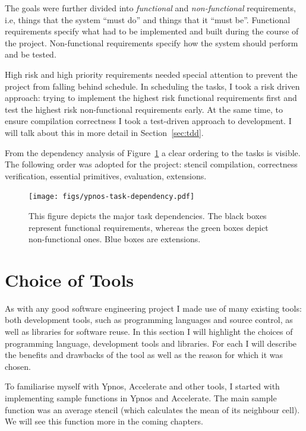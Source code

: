 \documentclass[12pt,a4paper,twoside]{scrbook}
\begin{document}
The goals were further divided into \emph{functional} and \emph{non-functional}
requirements, i.e, things that the system ``must do'' and things that it ``must
be''. Functional requirements specify what had to be implemented and built
during the course of the project. Non-functional requirements specify how the
system should perform and be tested.

High risk and high priority requirements needed special attention to prevent the
project from falling behind schedule. In scheduling the tasks, I took a risk
driven approach: trying to implement the highest risk functional requirements
first and test the highest risk non-functional requirements early. At the same
time, to ensure compilation correctness I took a test-driven approach to
development. I will talk about this in more detail in Section~\ref{sec:tdd}.

From the dependency analysis of Figure~\ref{fig:task-dep} a clear ordering to
the tasks is visible. The following order was adopted for the project: stencil
compilation, correctness verification, essential primitives, evaluation,
extensions.

\begin{figure}[h]
  \centering
  \texttt{[image: figs/ypnos-task-dependency.pdf]}
  \caption{This figure depicts the major task dependencies. The black boxes
    represent functional requirements, whereas the green boxes depict
    non-functional ones. Blue boxes are extensions.}
  \label{fig:task-dep}
\end{figure}

\section{Choice of Tools}

As with any good software engineering project I made use of many existing tools:
both development tools, such as programming languages and source control, as
well as libraries for software reuse. In this section I will highlight the
choices of programming language, development tools and libraries. For each I
will describe the benefits and drawbacks of the tool as well as the reason for
which it was chosen.

To familiarise myself with Ypnos, Accelerate and other tools, I started with
implementing sample functions in Ypnos and Accelerate. The main sample function
was an average stencil (which calculates the mean of its neighbour cell). We
will see this function more in the coming chapters.
\end{document}
